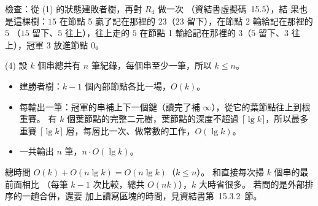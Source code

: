 \begin{pastsoln}
檢查：從 (1) 的狀態建敗者樹，再對 $R_4$ 做一次 （資結書虛擬碼~15.5），結
果也是這棵樹：$15$ 在節點 5 贏了記在那裡的 $23$（$23$ 留下），在節點 2 輸給記在那裡的 $5$
（$15$ 留下、$5$ 往上），往上走的 $5$ 在節點 1 輸給記在那裡的 $3$（$5$ 留下、$3$ 往上），冠軍 $3$ 放進節點 0。

(4) 設 $k$ 個串總共有 $n$ 筆紀錄，每個串至少一筆，所以 $k \le n$。
\begin{itemize}
\item 建勝者樹：$k - 1$ 個內部節點各比一場，$O(k)$。
\item 每輸出一筆：冠軍的串補上下一個鍵（讀完了補 $\infty$），從它的葉節點往上到根重賽。 有
$k$ 個葉節點的完整二元樹，葉節點的深度不超過 $\lceil \lg k \rceil$，所以最多重賽
$\lceil \lg k \rceil$ 層，每層比一次、做常數的工作，$O(\lg k)$。
\item 一共輸出 $n$ 筆，$n \cdot O(\lg k)$。
\end{itemize}
總時間 $O(k) + O(n \lg k) = O(n \lg k)$（$k \le n$）。 和直接每次掃 $k$ 個串的最前面相比
（每筆 $k - 1$ 次比較，總共 $O(nk)$），$k$ 大時省很多。 若問的是外部排序的一趟合併，還要
加上讀寫區塊的時間，見資結書第~15.3.2~節。
\end{pastsoln}
